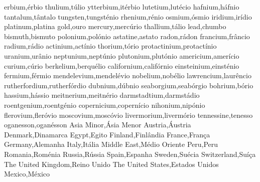 erbium,\'{e}rbio
thulium,t\'{u}lio
ytterbium,it\'{e}rbio
lutetium,lut\'{e}cio
hafnium,h\'{a}fnio
tantalum,t\^{a}ntalo
tungsten,tungst\'{e}nio
rhenium,r\'{e}nio
osmium,\'{o}smio
iridium,ir\'{i}dio
platinum,platina
gold,ouro
mercury,merc\'{u}rio
thallium,t\'{a}lio
lead,chumbo
bismuth,bismuto
polonium,pol\'{o}nio
astatine,astato
radon,r\'{a}don
francium,fr\^{a}ncio
radium,r\'{a}dio
actinium,act\'{i}nio
thorium,t\'{o}rio
protactinium,protact\'{i}nio
uranium,ur\^{a}nio
neptunium,nept\'{u}nio
plutonium,plut\'{o}nio
americium,amer\'{i}cio
curium,c\'{u}rio
berkelium,berqu\'{e}lio
californium,calif\'{o}rnio
einsteinium,einst\'{e}nio
fermium,f\'{e}rmio
mendelevium,mendel\'{e}vio
nobelium,nob\'{e}lio
lawrencium,laur\^{e}ncio
rutherfordium,rutherf\'{o}rdio
dubnium,d\'{u}bnio
seaborgium,seab\'{o}rgio
bohrium,b\'{o}rio
hassium,h\'{a}ssio
meitnerium,meitn\'{e}rio
darmstadtium,darmst\'{a}dio
roentgenium,roentg\'{e}nio
copernicium,copern\'{i}cio
nihonium,nip\'{o}nio
flerovium,fler\'{o}vio
moscovium,mosc\'{o}vio
livermorium,liverm\'{o}rio
tennessine,tenesso
oganesson,ogan\'{e}sson
Asia Minor,\'{A}sia Menor
Austria,\'{A}ustria
Denmark,Dinamarca
Egypt,Egito
Finland,Finl\^{a}ndia
France,Fran\c{c}a
Germany,Alemanha
Italy,It\'{a}lia
Middle East,M\'{e}dio Oriente
Peru,Peru
Romania,Rom\'{e}nia
Russia,R\'{u}ssia
Spain,Espanha
Sweden,Su\'{e}cia
Switzerland,Su\'{i}\c{c}a
The United Kingdom,Reino Unido
The United States,Estados Unidos
Mexico,M\'{e}xico
